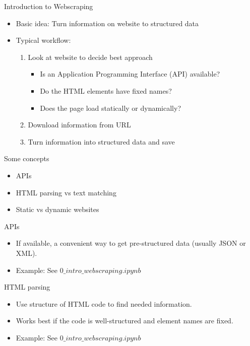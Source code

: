 \begin{frame}{Introduction to Webscraping}
\begin{itemize}
	\item Basic idea: Turn information on website to structured data
	\item Typical workflow:
	\begin{enumerate}
		\item Look at website to decide best approach
		\begin{itemize}
			\item Is an Application Programming Interface (API) available?
			\item Do the HTML elements have fixed names?
			\item Does the page load statically or dynamically?
		\end{itemize}
		\item Download information from URL
		\item Turn information into structured data and save
	\end{enumerate}
\end{itemize}
\end{frame}

\begin{frame}{Some concepts}
\begin{itemize}
	\item APIs
	\item HTML parsing vs text matching
	\item Static vs dynamic websites
\end{itemize}
\end{frame}

\begin{frame}{APIs}
\begin{itemize}
	\item If available, a convenient way to get pre-structured data (usually JSON or XML).
	\item Example: See $0\_intro\_webscraping.ipynb$
\end{itemize}
\end{frame}

\begin{frame}{HTML parsing}
\begin{itemize}
	\item Use structure of HTML code to find needed information.
	\item Works best if the code is well-structured and element names are fixed.
	\item Example: See $0\_intro\_webscraping.ipynb$
\end{itemize}
\end{frame}

